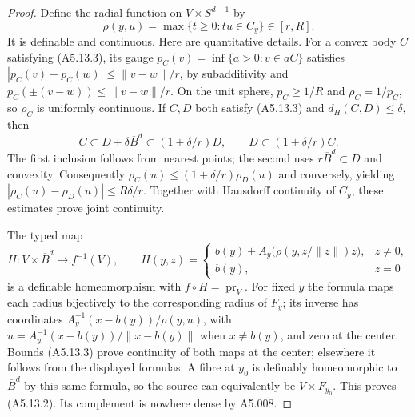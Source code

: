 \begin{proof}
Define the radial function on $V\times S^{d-1}$ by
\[
 \rho(y,u)=\max\{t\geq0:tu\in C_y\}\in[r,R].
\]
It is definable and continuous. Here are quantitative details.
For a convex body $C$ satisfying (A5.13.3), its gauge
$p_C(v)=\inf\{a>0:v\in aC\}$ satisfies
$|p_C(v)-p_C(w)|\leq\|v-w\|/r$, by subadditivity and
$p_C(\pm(v-w))\leq\|v-w\|/r$. On the unit sphere,
$p_C\geq1/R$ and $\rho_C=1/p_C$, so $\rho_C$ is uniformly continuous.
If $C,D$ both satisfy (A5.13.3) and $d_H(C,D)\leq\delta$, then
\[
 C\subset D+\delta\overline B^d\subset(1+\delta/r)D,
 \qquad D\subset(1+\delta/r)C.
\]
The first inclusion follows from nearest points; the second uses
$r\overline B^d\subset D$ and convexity. Consequently
$\rho_C(u)\leq(1+\delta/r)\rho_D(u)$ and conversely, yielding
$|\rho_C(u)-\rho_D(u)|\leq R\delta/r$. Together with Hausdorff
continuity of $C_y$, these estimates prove joint continuity.

The typed map
\[
 H:V\times\overline B^d\longrightarrow f^{-1}(V),\qquad
 H(y,z)=
 \begin{cases}
 b(y)+A_y\bigl(\rho(y,z/\|z\|)z\bigr),&z\ne0,\\
 b(y),&z=0
 \end{cases}
\]
is a definable homeomorphism with $f\circ H=\operatorname{pr}_V$.
For fixed $y$ the formula maps each radius bijectively to the
corresponding radius of $F_y$; its inverse has coordinates
$A_y^{-1}(x-b(y))/\rho(y,u)$, with
$u=A_y^{-1}(x-b(y))/\|x-b(y)\|$ when $x\ne b(y)$, and zero at the
center. Bounds (A5.13.3) prove continuity of both maps at the center;
elsewhere it follows from the displayed formulas. A fibre at $y_0$
is definably homeomorphic to $\overline B^d$ by this same formula,
so the source can equivalently be $V\times F_{y_0}$.
This proves (A5.13.2). Its complement is nowhere dense by A5.008.
\end{proof}

